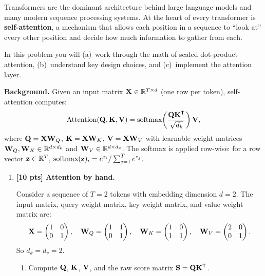 \documentclass[submit]{../harvardml}
\begin{document}
\begin{problem}

Transformers are the dominant architecture behind large language models and many modern
sequence processing systems.  At the heart of every transformer is \textbf{self-attention},
a mechanism that allows each position in a sequence to ``look at'' every other position
and decide how much information to gather from each.

In this problem you will (a)~work through the math of scaled dot-product attention,
(b)~understand key design choices, and (c)~implement the attention layer.

\medskip\noindent
\textbf{Background.}
Given an input matrix $\mathbf{X} \in \mathbb{R}^{T \times d}$ (one row per token),
self-attention computes:
\[
  \text{Attention}(\mathbf{Q}, \mathbf{K}, \mathbf{V})
  = \text{softmax}\!\left(\frac{\mathbf{Q} \mathbf{K}^{\mathsf{T}}}{\sqrt{d_k}}\right)\mathbf{V},
\]
where $\mathbf{Q} = \mathbf{X} \mathbf{W}_Q$, $\mathbf{K} = \mathbf{X} \mathbf{W}_K$,
$\mathbf{V} = \mathbf{X} \mathbf{W}_V$ with learnable weight matrices
$\mathbf{W}_Q, \mathbf{W}_K \in \mathbb{R}^{d \times d_k}$ and
$\mathbf{W}_V \in \mathbb{R}^{d \times d_v}$.
The softmax is applied row-wise: for a row vector $\mathbf{z} \in \mathbb{R}^T$,
$\text{softmax}(\mathbf{z})_i = e^{z_i} / \sum_{j=1}^{T} e^{z_j}$.

\begin{enumerate}

\item \textbf{[10 pts] Attention by hand.}

Consider a sequence of $T = 2$ tokens with embedding dimension $d = 2$. The input
matrix, query weight matrix, key weight matrix, and value weight matrix are:
\[
  \mathbf{X} = \begin{pmatrix} 1 & 0 \\ 0 & 1 \end{pmatrix}, \quad
  \mathbf{W}_Q = \begin{pmatrix} 1 & 1 \\ 0 & 1 \end{pmatrix}, \quad
  \mathbf{W}_K = \begin{pmatrix} 1 & 0 \\ 1 & 1 \end{pmatrix}, \quad
  \mathbf{W}_V = \begin{pmatrix} 2 & 0 \\ 0 & 1 \end{pmatrix}.
\]
So $d_k = d_v = 2$.

\begin{enumerate}
  \item Compute $\mathbf{Q}$, $\mathbf{K}$, $\mathbf{V}$, and the raw score matrix
  $\mathbf{S} = \mathbf{Q} \mathbf{K}^{\mathsf{T}}$.


\end{enumerate}
\end{enumerate}
\end{problem}
\end{document}
